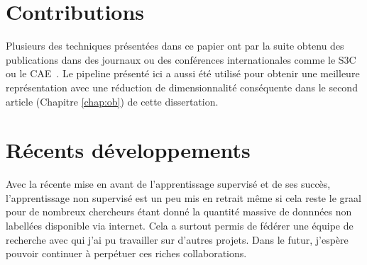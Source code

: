 \section{Contributions}

Plusieurs des techniques pr\'{e}sent\'{e}es dans ce papier ont par la suite
obtenu des publications dans des journaux ou des conf\'{e}rences
internationales comme le S3C~\citep{Courville+al-2011} ou le
CAE~\citep{Rifai+al-2011}. Le pipeline pr\'{e}sent\'{e} ici a aussi \'{e}t\'{e}
utilis\'{e} pour obtenir une meilleure repr\'{e}sentation avec une
r\'{e}duction de dimensionnalit\'{e} cons\'{e}quente dans le second article
(Chapitre \ref{chap:ob}) de cette dissertation. 

\section{R\'{e}cents d\'{e}veloppements}

Avec la r\'{e}cente mise en avant de l'apprentissage supervis\'{e} et de ses
succ\`{e}s, l'apprentissage non supervis\'{e} est un peu mis en retrait
m\^{e}me si cela reste le graal pour de nombreux chercheurs \'{e}tant donn\'{e}
la quantit\'{e} massive de donnn\'{e}es non labell\'{e}es disponible via
internet. Cela a surtout permis de f\'{e}d\'{e}rer une \'{e}quipe de recherche
avec qui j'ai pu travailler sur d'autres projets. Dans le futur, j'esp\`{e}re
pouvoir continuer \`{a} perp\'{e}tuer ces riches collaborations.
